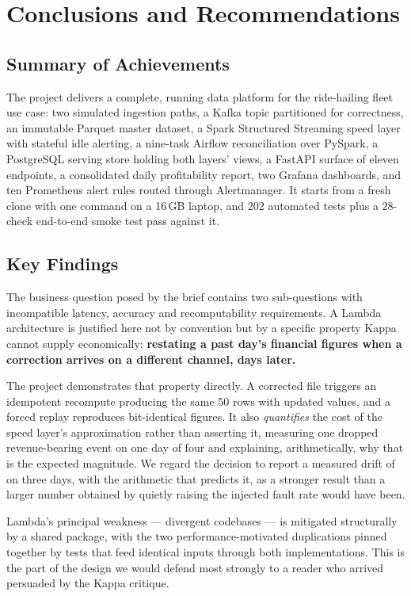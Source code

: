 \chapter{Conclusions and Recommendations}
\label{ch:conclusion}

\section{Summary of Achievements}

The project delivers a complete, running data platform for the
ride-hailing fleet use case: two simulated ingestion paths, a Kafka
topic partitioned for correctness, an immutable Parquet master dataset,
a Spark Structured Streaming speed layer with stateful idle alerting, a
nine-task Airflow reconciliation over PySpark, a PostgreSQL serving store
holding both layers' views, a FastAPI surface of eleven endpoints, a
consolidated daily profitability report, two Grafana dashboards, and ten
Prometheus alert rules routed through Alertmanager. It starts from a
fresh clone with one command on a 16\,GB laptop, and 202 automated tests
plus a 28-check end-to-end smoke test pass against it.

\section{Key Findings}

The business question posed by the brief contains two sub-questions with
incompatible latency, accuracy and recomputability requirements. A Lambda
architecture is justified here not by convention but by a specific
property Kappa cannot supply economically: \textbf{restating a past day's
financial figures when a correction arrives on a different channel, days
later.}

The project demonstrates that property directly. A corrected file
triggers an idempotent recompute producing the same 50 rows with updated
values, and a forced replay reproduces bit-identical figures. It also
\emph{quantifies} the cost of the speed layer's approximation rather than
asserting it, measuring one dropped revenue-bearing event on one day of
four and explaining, arithmetically, why that is the expected magnitude.
We regard the decision to report a measured drift of  on
three days, with the arithmetic that predicts it, as a stronger result
than a larger number obtained by quietly raising the injected fault rate
would have been.

Lambda's principal weakness --- divergent codebases --- is mitigated
structurally by a shared  package, with the two
performance-motivated duplications pinned together by tests that feed
identical inputs through both implementations. This is the part of the
design we would defend most strongly to a reader who arrived persuaded by
the Kappa critique.

